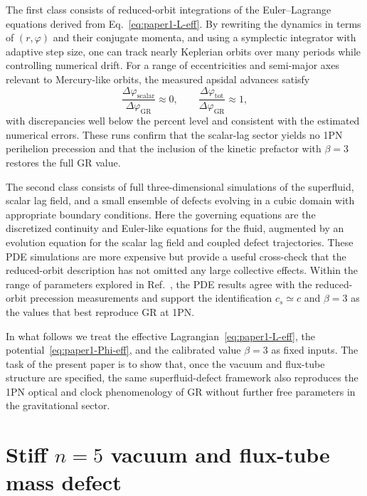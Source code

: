 \documentclass[11pt]{article}
\newcommand{\cS}{c_s}
\begin{document}
The first class consists of reduced-orbit integrations of the Euler--Lagrange
equations derived from Eq.~\eqref{eq:paper1-L-eff}.
By rewriting the dynamics in terms of $(r,\varphi)$ and their conjugate
momenta, and using a symplectic integrator with adaptive step size, one can
track nearly Keplerian orbits over many periods while controlling numerical
drift.
For a range of eccentricities and semi-major axes relevant to Mercury-like
orbits, the measured apsidal advances satisfy
\begin{equation}
  \frac{\Delta\varphi_{\text{scalar}}}
       {\Delta\varphi_{\text{GR}}}
  \approx 0,
  \qquad
  \frac{\Delta\varphi_{\text{tot}}}
       {\Delta\varphi_{\text{GR}}}
  \approx 1,
\end{equation}
with discrepancies well below the percent level and consistent with the
estimated numerical errors.
These runs confirm that the scalar-lag sector yields no 1PN perihelion
precession and that the inclusion of the kinetic prefactor with
$\beta = 3$ restores the full GR value.

The second class consists of full three-dimensional simulations of the
superfluid, scalar lag field, and a small ensemble of defects evolving in a
cubic domain with appropriate boundary conditions.
Here the governing equations are the discretized continuity and Euler-like
equations for the fluid, augmented by an evolution equation for the scalar
lag field and coupled defect trajectories.
These PDE simulations are more expensive but provide a useful cross-check
that the reduced-orbit description has not omitted any large collective
effects.
Within the range of parameters explored in Ref.~\cite{Norris:2025Orbits},
the PDE results agree with the reduced-orbit precession measurements and
support the identification $\cS \simeq c$ and $\beta = 3$ as the values
that best reproduce GR at 1PN.

In what follows we treat the effective Lagrangian~\eqref{eq:paper1-L-eff},
the potential~\eqref{eq:paper1-Phi-eff}, and the calibrated value
$\beta = 3$ as fixed inputs.
The task of the present paper is to show that, once the vacuum and flux-tube
structure are specified, the same superfluid-defect framework also reproduces
the 1PN optical and clock phenomenology of GR without further free parameters
in the gravitational sector.

\section{Stiff \texorpdfstring{$n=5$}{n=5} vacuum and flux-tube mass defect}
\label{sec:n5-vacuum}
\end{document}
